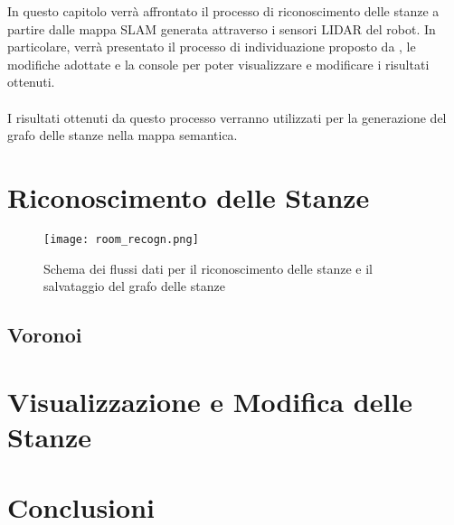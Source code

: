In questo capitolo verrà affrontato il processo di riconoscimento delle stanze a partire dalle mappa SLAM generata attraverso i sensori LIDAR del robot. In particolare, verrà presentato il processo di individuazione proposto da \cite{mora}, le modifiche adottate e la console per poter visualizzare e modificare i risultati ottenuti.\\\\
I risultati ottenuti da questo processo verranno utilizzati per la generazione del grafo delle stanze nella mappa semantica.

\section{Riconoscimento delle Stanze}

\begin{figure}[H]
  \centering
  \texttt{[image: room\_recogn.png]}
  \caption{Schema dei flussi dati per il riconoscimento delle stanze e il salvataggio del grafo delle stanze}
\end{figure}

\subsection{Voronoi}


\section{Visualizzazione e Modifica delle Stanze}

\section{Conclusioni}
